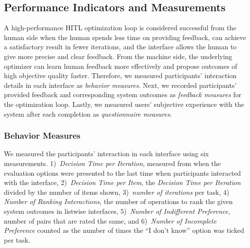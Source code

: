 \documentclass[acmsmall,screen,nonacm]{acmart}
\begin{document}
\subsection{Performance Indicators and Measurements}
\label{sec:measures}
A high-performance HITL optimization loop is considered successful from the human side when the human spends less time on providing feedback, can achieve a satisfactory result in fewer iterations, and the interface allows the human to give more precise and clear feedback. From the machine side, the underlying optimizer can learn human feedback more effectively and propose outcomes of high objective quality faster. Therefore, we measured participants' interaction details in each interface as \emph{behavior measures}. Next, we recorded participants' provided feedback and corresponding system outcomes as \emph{feedback measures} for the optimization loop. Lastly, we measured users' subjective experience with the system after each completion as \emph{questionnaire measures}.

\subsubsection{Behavior Measures}
We measured the participants' interaction in each interface using six measurements. 
1)~\emph{Decision Time per Iteration}, measured from when the evaluation options were presented to the last time when participants interacted with the interface,
2)~\emph{Decision Time per Item}, the \emph{Decision Time per Iteration} divided by the number of items shown,
3)~\emph{number of iterations} per task, 
4)~ \emph{Number of Ranking Interactions}, the number of operations to rank the given system outcomes in listwise interfaces,
5)~\emph{Number of Indifferent Preference}, number of pairs that are rated the same, and
6)~\emph{Number of Incomplete Preference} counted as the number of times the ``I don't know'' option was ticked per task.
\end{document}
